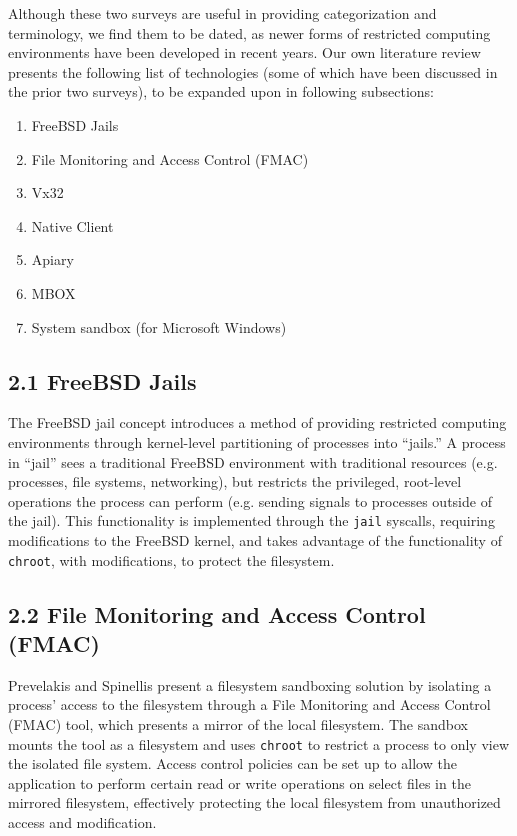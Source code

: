 \documentclass{proc}
\begin{document}
Although these two surveys are useful in providing categorization and terminology, we find them to be dated, as newer forms of restricted computing environments have been developed in recent years. Our own literature review presents the following list of technologies (some of which have been discussed in the prior two surveys), to be expanded upon in following subsections:
\begin{enumerate}
    \item FreeBSD Jails \cite{kamp2000jails}
    \item File Monitoring and Access Control (FMAC) \cite{prevelakis2001fmac}
    \item Vx32 \cite{ford2008vx32}
    \item Native Client \cite{yee2009native}
    \item Apiary \cite{potter2010apiary}
    \item MBOX \cite{kim2013mbox}
    \item System sandbox (for Microsoft Windows) \cite{vokorokos2015sandboxMSWIN}
\end{enumerate}

\subsection*{2.1 FreeBSD Jails}

The FreeBSD jail concept \cite{kamp2000jails} introduces a method of providing restricted computing environments through kernel-level partitioning of processes into ``jails.'' A process in ``jail'' sees a traditional FreeBSD environment with traditional resources (e.g. processes, file systems, networking), but restricts the privileged, root-level operations the process can perform (e.g. sending signals to processes outside of the jail). This functionality is implemented through the \texttt{jail} syscalls, requiring modifications to the FreeBSD kernel, and takes advantage of the functionality of \texttt{chroot}, with modifications, to protect the filesystem.

\subsection*{2.2 File Monitoring and Access Control (FMAC)}

Prevelakis and Spinellis \cite{prevelakis2001fmac} present a filesystem sandboxing solution by isolating a process' access to the filesystem through a File Monitoring and Access Control (FMAC) tool, which presents a mirror of the local filesystem. The sandbox mounts the tool as a filesystem and uses \texttt{chroot} to restrict a process to only view the isolated file system. Access control policies can be set up to allow the application to perform certain read or write operations on select files in the mirrored filesystem, effectively protecting the local filesystem from unauthorized access and modification.
\end{document}
